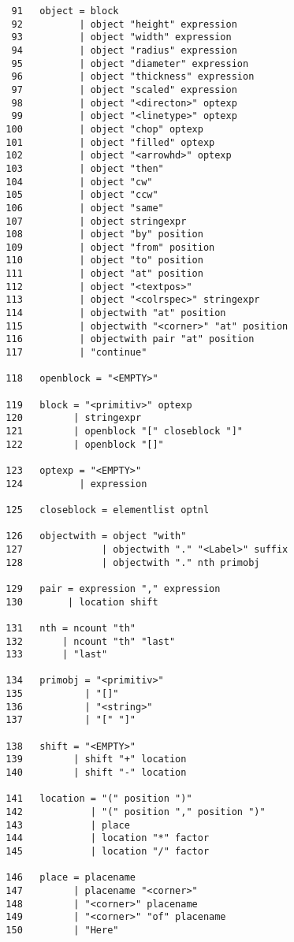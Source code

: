 \documentclass[11pt]{article}
\begin{document}
\begin{verbatim}
   91   object = block 
   92          | object "height" expression 
   93          | object "width" expression 
   94          | object "radius" expression 
   95          | object "diameter" expression 
   96          | object "thickness" expression 
   97          | object "scaled" expression 
   98          | object "<directon>" optexp 
   99          | object "<linetype>" optexp 
  100          | object "chop" optexp 
  101          | object "filled" optexp 
  102          | object "<arrowhd>" optexp 
  103          | object "then" 
  104          | object "cw" 
  105          | object "ccw" 
  106          | object "same" 
  107          | object stringexpr 
  108          | object "by" position 
  109          | object "from" position 
  110          | object "to" position 
  111          | object "at" position 
  112          | object "<textpos>" 
  113          | object "<colrspec>" stringexpr 
  114          | objectwith "at" position 
  115          | objectwith "<corner>" "at" position 
  116          | objectwith pair "at" position 
  117          | "continue" 

  118   openblock = "<EMPTY>" 

  119   block = "<primitiv>" optexp 
  120         | stringexpr 
  121         | openblock "[" closeblock "]" 
  122         | openblock "[]" 

  123   optexp = "<EMPTY>" 
  124          | expression 

  125   closeblock = elementlist optnl 

  126   objectwith = object "with" 
  127              | objectwith "." "<Label>" suffix 
  128              | objectwith "." nth primobj 

  129   pair = expression "," expression 
  130        | location shift 

  131   nth = ncount "th" 
  132       | ncount "th" "last" 
  133       | "last" 

  134   primobj = "<primitiv>" 
  135           | "[]" 
  136           | "<string>" 
  137           | "[" "]" 

  138   shift = "<EMPTY>" 
  139         | shift "+" location 
  140         | shift "-" location 

  141   location = "(" position ")" 
  142            | "(" position "," position ")" 
  143            | place 
  144            | location "*" factor 
  145            | location "/" factor 

  146   place = placename 
  147         | placename "<corner>" 
  148         | "<corner>" placename 
  149         | "<corner>" "of" placename 
  150         | "Here" 


\end{verbatim}
\end{document}
